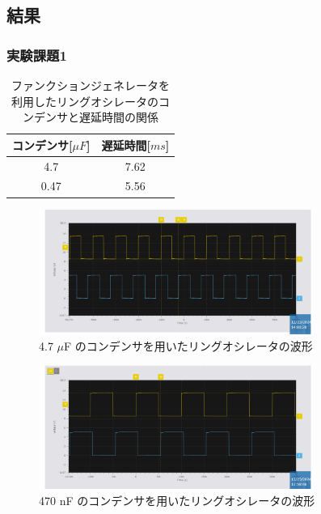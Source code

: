 \documentclass{ltjsarticle}
\begin{document}
\subsection{結果}
\subsubsection{実験課題1}
\begin{table}[H]
\centering
\begin{tabular}{|c|c|}
\hline
コンデンサ[${\mu F}$] & 遅延時間[${ms}$] \\ \hline
4.7 & 7.62  \\ \hline
0.47 & 5.56 \\ \hline
\end{tabular}
\caption{ファンクションジェネレータを利用したリングオシレータのコンデンサと遅延時間の関係}
\label{tab:results_1}
\end{table}

\begin{figure}[H]
\centering
\includegraphics[width=0.8\textwidth]{figs/1-4700nF.png}
\caption{4.7 $\mu$F のコンデンサを用いたリングオシレータの波形}
\label{fig:1_4.7_experiment_results}
\end{figure}

\begin{figure}[H]
  \centering
  \includegraphics[width=0.8\textwidth]{figs/1-470mF.png}
  \caption{470 nF のコンデンサを用いたリングオシレータの波形}
  \label{fig:1_470_experiment_results}
  \end{figure}
\end{document}
